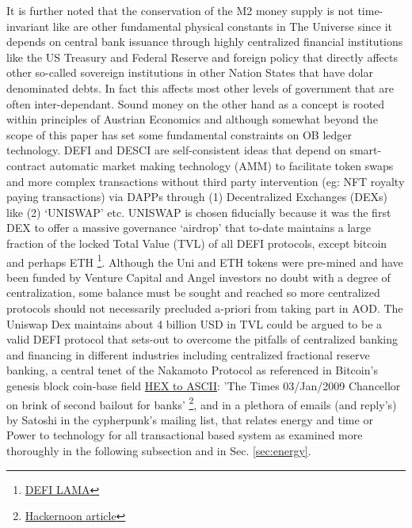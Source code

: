 \documentclass[final,5p,times,twocolumn,authoryear]{elsarticle}
\begin{document}
It is further noted that the conservation of the M2 money supply is not time-invariant like are other fundamental physical constants in The Universe since it depends on central bank issuance through highly centralized financial institutions like the US Treasury and Federal Reserve and foreign policy that directly affects other so-called sovereign institutions in other Nation States that have dolar denominated debts. In fact this affects most other levels of government that are often inter-dependant. Sound money on the other hand as a concept is rooted within principles of Austrian Economics  \citet{Hansen2020Book} and although somewhat beyond the scope of this paper has set some fundamental constraints on OB ledger technology. 
DEFI and DESCI are self-consistent ideas that depend on smart-contract automatic market making technology (AMM) to facilitate token swaps and more complex transactions without third party intervention (eg: NFT royalty paying transactions) via DAPPs through (1) Decentralized Exchanges (DEXs) like (2) `UNISWAP' etc. UNISWAP is chosen fiducially because it was the first DEX to offer a massive governance `airdrop' that to-date maintains a large fraction of the locked Total Value (TVL) of all DEFI protocols, except bitcoin and perhaps ETH \footnote{\href{https://defillama.com/protocols/dexes}{DEFI LAMA}}. Although the Uni and ETH tokens were pre-mined and have been funded by Venture Capital and Angel investors no doubt with a degree of centralization, some balance must be sought and reached so more centralized protocols should not necessarily precluded a-priori from taking part in AOD. The Uniswap Dex maintains about 4 billion USD in TVL could be argued to be a valid DEFI protocol that sets-out to overcome the pitfalls of centralized banking and financing in different industries including centralized fractional reserve banking, a central tenet of the Nakamoto Protocol as referenced in Bitcoin's genesis block \textrm{coin-base field} \href{https://www.Blockchain.com/btc/tx/4a5e1e4baab89f3a32518a88c31bc87f618f76673e2cc77ab2127b7afdeda33b}{HEX to ASCII}:  'The Times 03/Jan/2009 Chancellor on brink of second bailout for banks' \footnote{\href{https://hackernoon.com/chancellor-on-brink-of-second-bailout-for-banks-where-to-find-this-on-the-bitcoin-blockchain-hm4k34v4}{Hackernoon article}}, and in a plethora of emails (and reply's) by Satoshi in the cypherpunk's mailing list, that relates energy and time or Power to technology for all transactional based system as examined more thoroughly in the following subsection and in Sec. \ref{sec:energy}.
\end{document}
